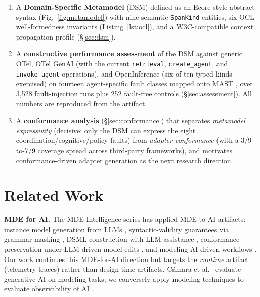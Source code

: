 \documentclass[sigconf,nonacm]{acmart}
\begin{document}
\begingroup\sloppy
\begin{enumerate}[label=(C\arabic*),leftmargin=*]
\item A \textbf{Domain-Specific Metamodel} (DSM) defined as an Ecore-style abstract syntax (Fig.~\ref{fig:metamodel}) with nine semantic \texttt{SpanKind} entities, six OCL well-formedness invariants (Listing~\ref{lst:ocl}), and a W3C-compatible context propagation profile (\S\ref{sec:dsm}).
\item A \textbf{constructive performance assessment} of the DSM against generic OTel, OTel GenAI (with the current \texttt{retrieval}, \texttt{create\_agent}, and \texttt{invoke\_agent} operations), and OpenInference (six of ten typed kinds exercised) on fourteen agent-specific fault classes mapped onto MAST \cite{cemri2025multiagent}, over 3{,}528 fault-injection runs plus 252 fault-free controls (\S\ref{sec:assessment}). All numbers are reproduced from the artifact.
\item A \textbf{conformance analysis} (\S\ref{sec:conformance}) that separates \emph{metamodel expressivity} (decisive: only the DSM can express the eight coordination/cognitive/policy faults) from \emph{adapter conformance} (with a 3/9-to-7/9 coverage spread across third-party frameworks), and motivates conformance-driven adapter generation as the next research direction.
\end{enumerate}
\endgroup

\section{Related Work}
\label{sec:related}

\textbf{MDE for AI.} The MDE Intelligence series has applied MDE to AI artifacts: instance model generation from LLMs \cite{pan2025instance}, syntactic-validity guarantees via grammar masking \cite{netz2024grammarmask}, DSML construction with LLM assistance \cite{disipio2024dsml}, conformance preservation under LLM-driven model edits \cite{netz2025unintended}, and modeling AI-driven workflows \cite{sousa2025aiworkflows}. Our work continues this MDE-for-AI direction but targets the \emph{runtime} artifact (telemetry traces) rather than design-time artifacts. C\'amara et al.\ \cite{camara2023assessment} evaluate generative AI on modeling tasks; we conversely apply modeling techniques to evaluate observability of AI \cite{burgueno2022editorial}.
\end{document}
